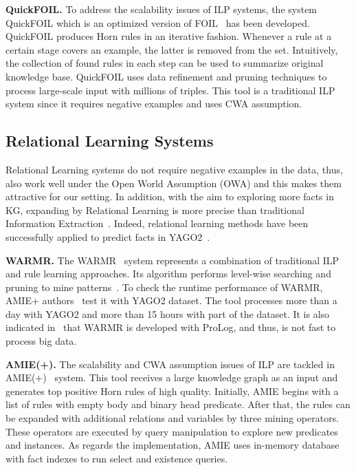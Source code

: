 \textbf{QuickFOIL.} To address the scalability issues of ILP systems, the system QuickFOIL which is an optimized version of FOIL~\cite{ref36} has been developed. QuickFOIL produces Horn rules in an iterative fashion. Whenever a rule at a certain stage covers an example, the latter is removed from the set. Intuitively, the collection of found rules in each step can be used to summarize original knowledge base. QuickFOIL uses data refinement and pruning techniques to process large-scale input with millions of triples. This tool is a traditional ILP system since it requires negative examples and uses CWA assumption.

\subsection{Relational Learning Systems}

Relational Learning systems do not require negative examples in the data, thus, also work well under the Open World Assumption (OWA) and this makes them attractive for our setting. In addition, with the aim to exploring more facts in KG, expanding by Relational Learning is more precise than traditional Information Extraction~\cite{ref29}. Indeed, relational learning methods have been successfully applied to predict facts in YAGO2~\cite{ref30}.

\textbf{WARMR.} The WARMR~\cite{ref16, ref17} system represents a combination of traditional ILP and rule learning approaches. Its algorithm performs level-wise searching and pruning to mine patterns~\cite{ref10}. To check the runtime performance of WARMR, AMIE+ authors~\cite{ref10} test it with YAGO2 dataset. The tool processes more than a day with YAGO2 and more than 15 hours with part of the dataset. It is also indicated in~\cite{ref10} that WARMR is developed with ProLog, and thus, is not fast to process big data.

\textbf{AMIE(+).} The scalability and CWA assumption issues of ILP are tackled in AMIE(+)~\cite{ref10} system. This tool receives a large knowledge graph as an input and generates top positive Horn rules of high quality. Initially, AMIE begins with a list of rules with empty body and binary head predicate. After that, the rules can be expanded with additional relations and variables by three mining operators. These operators are executed by query manipulation to explore new predicates and instances. As regards the implementation, AMIE uses in-memory database with fact indexes to run select and existence queries.

